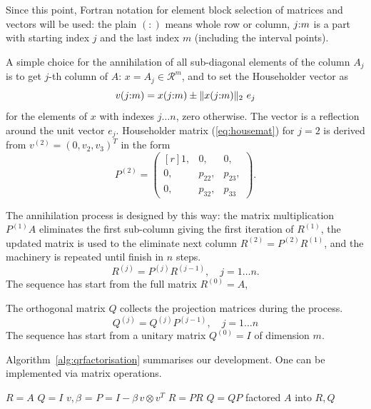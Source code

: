 \begin{refsection}
Since this point, Fortran notation for element block selection of matrices
and vectors will be used:
the plain $(:)$ means whole row or column,
$j{:}m$ is a part with starting index $j$
and the last index $m$ (including the interval points).


A simple choice for the annihilation of all sub-diagonal elements of
the column $A_j$ is to get $j$-th column of $A$:
$x = A_j \in \mathcal{R}^m$, and to set the Householder vector as
\begin{equation}
  v(j{:}m) = x(j{:}m) \pm \lVert x(j{:}m) \rVert_2 \ e_j
\end{equation}
for the elements of $x$ with indexes $j \ldots n$, zero otherwise.
The vector is a reflection around the unit vector $e_j$.
Householder matrix (\ref{eq:housemat}) for $j=2$ is derived
from $v^{(2)} = (0,v_2,v_3)^T$ in the form
\begin{equation}
  P^{(2)} =
    \begin{pmatrix*}[r]
      1, & 0, & 0,\\
      0, & p_{22}, & p_{23},\\
      0, & p_{32}, & p_{33}
    \end{pmatrix*}.
\end{equation}

The annihilation process is designed by this way: the matrix multiplication
$P^{(1)} A$ eliminates the first sub-column giving
the first iteration of $R^{(1)}$, the updated matrix is used to
the eliminate next column $R^{(2)} = P^{(2)} R^{(1)}$, and the machinery
is repeated until finish in $n$ steps.
\begin{equation}
  R^{(j)} = P^{(j)} R^{(j-1)}, \quad j = 1 \dots n.
\end{equation}
The sequence has start from the full matrix $R^{(0)} = A$,

The orthogonal matrix $Q$ collects the projection matrices
during the process.
\begin{equation}
  Q^{(j)} = Q^{(j)} P^{(j-1)}, \quad j = 1 \dots n
\end{equation}
The sequence has start from a unitary matrix $Q^{(0)} = I$ of dimension $m$.

Algorithm~\ref{alg:qrfactorisation} summarises our development.
One can be implemented via matrix operations.


\begin{algorithm}
  \caption{QR factorisation}
  \label{alg:qrfactorisation}
  \begin{algorithmic}
    \State {}
    \State $R = A$
    \State $Q = I$
    \State $v, \beta$ = 
    \State $P = I - \beta \, v \otimes v^T$
    \State $R = P R$
    \State $Q = Q P$
    \EndFor
    \State \Return factored $A$ into $R,Q$
  \end{algorithmic}
\end{algorithm}


\end{refsection}

